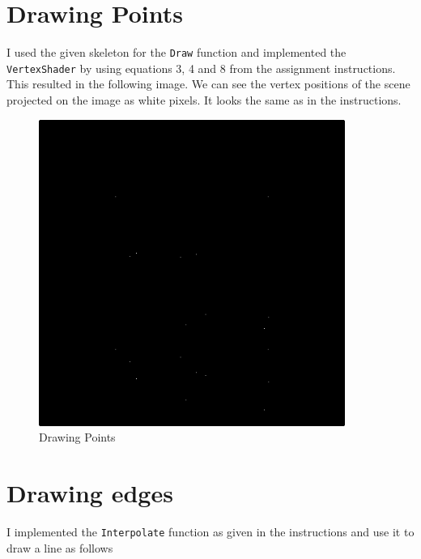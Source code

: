 \section{Drawing Points} 
I used the given skeleton for the \texttt{Draw} function and implemented the \texttt{VertexShader} by using equations 3, 4 and 8 from the assignment instructions.
This resulted in the following image. We can see the vertex positions of the scene projected on the image as white pixels.
It looks the same as in the instructions.
\begin{figure}[ht]
    \centering
    \includegraphics[width=10cm]{screenshots/drawing_points.png}
    \caption{Drawing Points}
\end{figure}

\section{Drawing edges}
I implemented the \texttt{Interpolate} function as given in the instructions and use it to draw a line as follows

